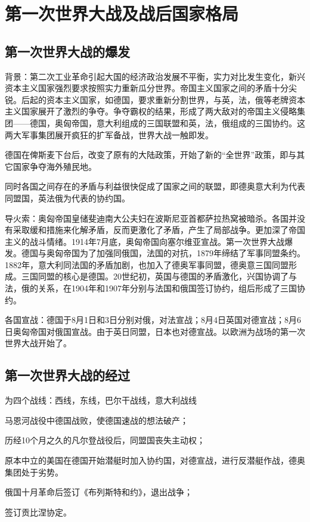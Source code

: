 \section{第一次世界大战及战后国家格局}

\subsection{第一次世界大战的爆发}
背景：第二次工业革命引起大国的经济政治发展不平衡，实力对比发生变化，新兴资本主义国家强烈要求按照实力重新瓜分世界。帝国主义国家之间的矛盾十分尖锐。后起的资本主义国家，如德国，要求重新分割世界，与英，法，俄等老牌资本主义国家展开了激烈的争夺。争夺霸权的结果，形成了两大敌对的帝国主义侵略集团——德国，奥匈帝国，意大利组成的三国联盟和英，法，俄组成的三国协约。这两大军事集团展开疯狂的扩军备战，世界大战一触即发。

德国在俾斯麦下台后，改变了原有的大陆政策，开始了新的“全世界”政策，即与其它国家争夺海外殖民地。

同时各国之间存在的矛盾与利益很快促成了国家之间的联盟，即德奥意大利为代表同盟国，英法俄为代表的协约国。

导火索：奥匈帝国皇储斐迪南大公夫妇在波斯尼亚首都萨拉热窝被暗杀。各国并没有采取缓和措施来化解矛盾，反而更激化了矛盾，产生了局部战争。更加深了帝国主义的战斗情绪。1914年7月底，奥匈帝国向塞尔维亚宣战。第一次世界大战爆发。德国与奥匈帝国为了加强同俄国，法国的对抗，1879年缔结了军事同盟条约。1882年，意大利同法国的矛盾加剧，也加入了德奥军事同盟，德奥意三国同盟形成。三国同盟的核心是德国。20世纪初，英国与德国的矛盾激化，兴国协调了与法，俄的关系，在1904年和1907年分别与法国和俄国签订协约，组后形成了三国协约。

各国宣战：德国于8月1日和3日分别对俄，对法宣战；8月4日英国对德宣战；8月6日奥匈帝国对俄国宣战。由于英日同盟，日本也对德宣战。以欧洲为战场的第一次世界大战开始了。

\subsection{第一次世界大战的经过}
为四个战线：西线，东线，巴尔干战线，意大利战线

马恩河战役中德国战败，使德国速战的想法破产；

历经10个月之久的凡尔登战役后，同盟国丧失主动权；

原本中立的美国在德国开始潜艇时加入协约国，对德宣战，进行反潜艇作战，德奥集团处于劣势。

俄国十月革命后签订《布列斯特和约》，退出战争；

签订贡比涅协定。

